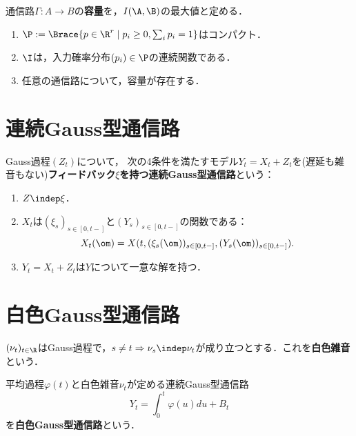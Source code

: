\documentclass[uplatex,dvipdfmx]{jsreport}
\begin{document}
\begin{definition}[capacity]
    通信路$\Gamma:A\to B$の\textbf{容量}を，$I(\A,\B)$の最大値と定める．
\end{definition}

\begin{theorem}\mbox{}
    \begin{enumerate}
        \item $\P:=\Brace{p\in\R^r\mid p_i\ge 0,\sum_ip_i=1}$はコンパクト．
        \item $\I$は，入力確率分布$(p_i)\in\P$の連続関数である．
        \item 任意の通信路について，容量が存在する．
    \end{enumerate}
\end{theorem}

\section{連続Gauss型通信路}

\begin{model}
    Gauss過程$(Z_t)$について，
    次の4条件を満たすモデル$Y_t=X_t+Z_t$を(遅延も雑音もない)\textbf{フィードバック$\xi$を持つ連続Gauss型通信路}という：
    \begin{enumerate}
        \item $Z\indep\xi$．
        \item $X_t$は$(\xi_s)_{s\in[0,t-]}$と$(Y_s)_{s\in[0,t-]}$の関数である：
        \[X_t(\om)=X(t,(\xi_s(\om))_{s\in[0,t-]},(Y_s(\om))_{s\in[0,t-]}).\]
        \item $Y_t=X_t+Z_t$は$Y$について一意な解を持つ．
    \end{enumerate}
\end{model}

\section{白色Gauss型通信路}

\begin{definition}
    $(\nu_t)_{t\in\R}$はGauss過程で，$s\ne t\Rightarrow\nu_s\indep\nu_t$が成り立つとする．これを\textbf{白色雑音}という．
\end{definition}

\begin{model}
    平均過程$\varphi(t)$と白色雑音$\nu_t$が定める連続Gauss型通信路
    \[Y_t=\int^t_0\varphi(u)du+B_t\]
    を\textbf{白色Gauss型通信路}という．
\end{model}
\end{document}

